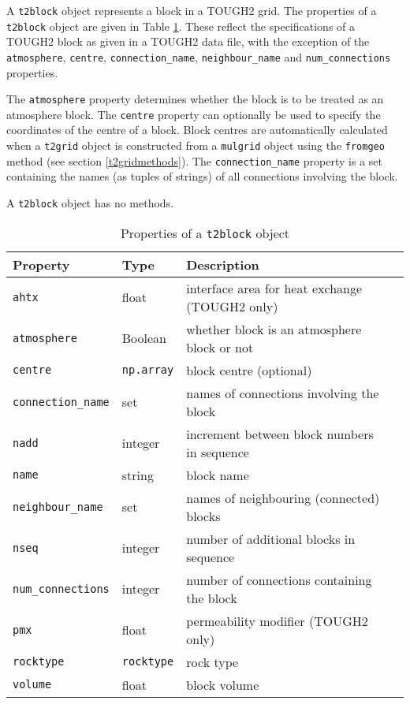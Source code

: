 A \texttt{t2block} object represents a block in a TOUGH2 grid.  The properties of a \texttt{t2block} object are given in Table \ref{tb:t2block_properties}.  These reflect the specifications of a TOUGH2 block as given in a TOUGH2 data file, with the exception of the \texttt{atmosphere}, \texttt{centre}, \texttt{connection\_name}, \texttt{neighbour\_name} and \texttt{num\_connections} properties.

The \texttt{atmosphere} property determines whether the block is to be treated as an atmosphere block.  The \texttt{centre} property can optionally be used to specify the coordinates of the centre of a block.  Block centres are automatically calculated when a \texttt{t2grid} object is constructed from a \texttt{mulgrid} object using the \texttt{fromgeo} method (see section \ref{t2gridmethods}).  The \texttt{connection\_name} property is a set containing the names (as tuples of strings) of all connections involving the block.

A \texttt{t2block} object has no methods.

\begin{table}
  \begin{center}
    \begin{tabular}{|l|l|l|l|}
      \hline
      \textbf{Property} & \textbf{Type} & \textbf{Description}\\
      \hline
      \texttt{ahtx} & float & interface area for heat exchange (TOUGH2 only)\\
      \texttt{atmosphere} & Boolean & whether block is an atmosphere block or not\\
      \texttt{centre} & \texttt{np.array} & block centre (optional)\\
      \texttt{connection\_name} & set & names of connections involving the block\\
      \texttt{nadd} & integer & increment between block numbers in sequence\\
      \texttt{name} & string & block name\\
      \texttt{neighbour\_name} & set & names of neighbouring (connected) blocks\\
      \texttt{nseq} & integer & number of additional blocks in sequence\\
      \texttt{num\_connections} & integer & number of connections containing the block\\
      \texttt{pmx} & float & permeability modifier (TOUGH2 only)\\
      \texttt{rocktype} & \texttt{rocktype} & rock type\\
      \texttt{volume} & float & block volume\\
      \hline
    \end{tabular}
    \caption{Properties of a \texttt{t2block} object}
    \label{tb:t2block_properties}
  \end{center}
\end{table}


